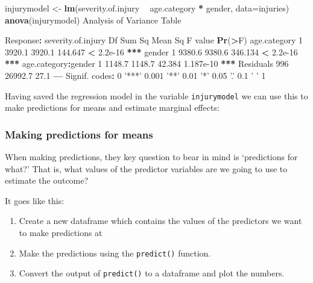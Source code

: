 \documentclass[]{article}
\newenvironment{Shaded}{\begin{snugshade}}{\end{snugshade}}
\newcommand{\DataTypeTok}[1]{\textcolor[rgb]{0.13,0.29,0.53}{#1}}
\newcommand{\DecValTok}[1]{\textcolor[rgb]{0.00,0.00,0.81}{#1}}
\newcommand{\ErrorTok}[1]{\textcolor[rgb]{0.64,0.00,0.00}{\textbf{#1}}}
\newcommand{\FloatTok}[1]{\textcolor[rgb]{0.00,0.00,0.81}{#1}}
\newcommand{\KeywordTok}[1]{\textcolor[rgb]{0.13,0.29,0.53}{\textbf{#1}}}
\newcommand{\NormalTok}[1]{#1}
\newcommand{\OperatorTok}[1]{\textcolor[rgb]{0.81,0.36,0.00}{\textbf{#1}}}
\newcommand{\StringTok}[1]{\textcolor[rgb]{0.31,0.60,0.02}{#1}}
\providecommand{\tightlist}{%
  \setlength{\itemsep}{0pt}\setlength{\parskip}{0pt}}
\begin{document}
\begin{Shaded}
\begin{Highlighting}[]
\NormalTok{injurymodel <-}\StringTok{ }\KeywordTok{lm}\NormalTok{(severity.of.injury }\OperatorTok{~}\StringTok{ }\NormalTok{age.category }\OperatorTok{*}\StringTok{ }\NormalTok{gender,  }\DataTypeTok{data=}\NormalTok{injuries)}
\KeywordTok{anova}\NormalTok{(injurymodel)}
\NormalTok{Analysis of Variance Table}

\NormalTok{Response}\OperatorTok{:}\StringTok{ }\NormalTok{severity.of.injury}
\NormalTok{                     Df  Sum Sq Mean Sq F value    }\KeywordTok{Pr}\NormalTok{(}\OperatorTok{>}\NormalTok{F)    }
\NormalTok{age.category          }\DecValTok{1}  \FloatTok{3920.1}  \FloatTok{3920.1} \FloatTok{144.647} \OperatorTok{<}\StringTok{ }\FloatTok{2.2e-16} \OperatorTok{**}\ErrorTok{*}
\NormalTok{gender                }\DecValTok{1}  \FloatTok{9380.6}  \FloatTok{9380.6} \FloatTok{346.134} \OperatorTok{<}\StringTok{ }\FloatTok{2.2e-16} \OperatorTok{**}\ErrorTok{*}
\NormalTok{age.category}\OperatorTok{:}\NormalTok{gender   }\DecValTok{1}  \FloatTok{1148.7}  \FloatTok{1148.7}  \FloatTok{42.384} \FloatTok{1.187e-10} \OperatorTok{**}\ErrorTok{*}
\NormalTok{Residuals           }\DecValTok{996} \FloatTok{26992.7}    \FloatTok{27.1}                      
\OperatorTok{---}
\NormalTok{Signif. codes}\OperatorTok{:}\StringTok{  }\DecValTok{0} \StringTok{'***'} \FloatTok{0.001} \StringTok{'**'} \FloatTok{0.01} \StringTok{'*'} \FloatTok{0.05} \StringTok{'.'} \FloatTok{0.1} \StringTok{' '} \DecValTok{1}
\end{Highlighting}
\end{Shaded}

Having saved the regression model in the variable \texttt{injurymodel} we can use this
to make predictions for means and estimate marginal effects:

\hypertarget{making-predictions-for-means}{%
\subsubsection*{Making predictions for means}\label{making-predictions-for-means}}

When making predictions, they key question to bear in mind is `predictions for
what?' That is, what values of the predictor variables are we going to use to
estimate the outcome?

It goes like this:

\begin{enumerate}
\def\labelenumi{\arabic{enumi}.}
\tightlist
\item
  Create a new dataframe which contains the values of the predictors we want to
  make predictions at
\item
  Make the predictions using the \texttt{predict()} function.
\item
  Convert the output of \texttt{predict()} to a dataframe and plot the numbers.
\end{enumerate}
\end{document}
